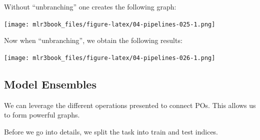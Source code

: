 \documentclass[12pt,]{scrbook}
\newenvironment{Shaded}{}{}
\newcommand{\CommentTok}[1]{\textcolor[rgb]{0.00,0.50,0.00}{#1}}
\newcommand{\DataTypeTok}[1]{#1}
\newcommand{\DecValTok}[1]{#1}
\newcommand{\KeywordTok}[1]{\textcolor[rgb]{0.00,0.00,1.00}{#1}}
\newcommand{\NormalTok}[1]{#1}
\newcommand{\OperatorTok}[1]{#1}
\newcommand{\OtherTok}[1]{\textcolor[rgb]{1.00,0.25,0.00}{#1}}
\newcommand{\StringTok}[1]{\textcolor[rgb]{0.00,0.50,0.50}{#1}}
\begin{document}
Without ``unbranching'' one creates the following graph:

\begin{Shaded}
\end{Shaded}

\texttt{[image: mlr3book\_files/figure-latex/04-pipelines-025-1.png]}

Now when ``unbranching'', we obtain the following results:

\begin{Shaded}
\end{Shaded}

\texttt{[image: mlr3book\_files/figure-latex/04-pipelines-026-1.png]}

\hypertarget{pipe-model-ensembles}{%
\subsection{Model Ensembles}\label{pipe-model-ensembles}}

We can leverage the different operations presented to connect POs.
This allows us to form powerful graphs.

Before we go into details, we split the task into train and test indices.

\begin{Shaded}
\end{Shaded}
\end{document}
